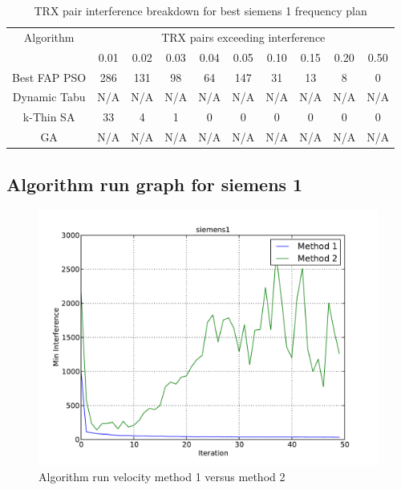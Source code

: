 \begin{table}[H]
\centering
	\begin{tabular}{cccccccccc}
	\toprule
    Algorithm & \multicolumn{9}{c}{TRX pairs exceeding interference}\\
    & 0.01 & 0.02 & 0.03 & 0.04 & 0.05 & 0.10 & 0.15 & 0.20 & 0.50 \\
    \midrule
    Best FAP PSO & 286 & 131 & 98 & 64 & 147 & 31 & 13 & 8 & 0\\
    Dynamic Tabu & \scriptsize{N/A} & \scriptsize{N/A} & \scriptsize{N/A} & \scriptsize{N/A} & \scriptsize{N/A} & \scriptsize{N/A} & \scriptsize{N/A} & \scriptsize{N/A} & \scriptsize{N/A}\\
    k-Thin SA & 33 & 4 & 1 & 0 & 0 & 0 & 0 & 0 & 0 \\
    GA & \scriptsize{N/A} & \scriptsize{N/A} & \scriptsize{N/A} & \scriptsize{N/A} & \scriptsize{N/A} & \scriptsize{N/A} & \scriptsize{N/A} & \scriptsize{N/A} & \scriptsize{N/A}\\
    \bottomrule
	\end{tabular}
\caption{TRX pair interference breakdown for best siemens 1 frequency plan}
\label{tab:breakdown-siem1m1}
\end{table}

\subsection{Algorithm run graph for siemens 1}
\begin{figure}[H]
	\begin{centering}
    \includegraphics[scale=0.50]{../Implementation/data-cruncher/graph/siemens1.pdf}
	\caption{Algorithm run velocity method 1 versus method 2}
	\label{fig:siem1graph}
	\end{centering}
\end{figure}

